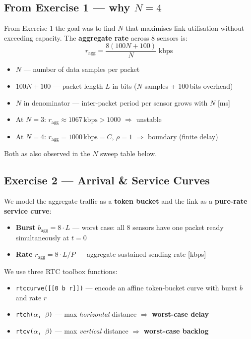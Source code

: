 \documentclass[10pt,a4paper]{article}
\begin{document}
\subsection*{From Exercise 1 --- why $N=4$}
From Exercise 1 the goal was to find $N$ that maximises link utilisation without exceeding capacity. The \textbf{aggregate rate} across 8 sensors is:
\[ r_{\text{agg}} = \frac{8(100N+100)}{N}\;\text{kbps} \]
\begin{itemize}
  \item $N$ --- number of data samples per packet
  \item $100N + 100$ --- packet length $L$ in bits ($N$ samples + 100\,bits overhead)
  \item $N$ in denominator --- inter-packet period per sensor grows with $N$ [ms]
\end{itemize}
\begin{notebox}
\begin{itemize}
  \item At $N=3$: $r_{\text{agg}} \approx 1067\,\text{kbps} > 1000$ $\Rightarrow$ unstable
  \item At $N=4$: $r_{\text{agg}} = 1000\,\text{kbps} = C$, $\rho = 1$ $\Rightarrow$ boundary (finite delay)
\end{itemize}
Both as also observed in the $N$ sweep table below. \\
\end{notebox}
\subsection*{Exercise 2 --- Arrival \& Service Curves}
We model the aggregate traffic as a \textbf{token bucket} and the link as a \textbf{pure-rate service curve}:
\begin{itemize}
  \item \textbf{Burst} $b_{\text{agg}} = 8 \cdot L$ --- worst case: all 8 sensors have one packet ready simultaneously at $t=0$
  \item \textbf{Rate} $r_{\text{agg}} = 8 \cdot L/P$ --- aggregate sustained sending rate [kbps]
\end{itemize}
We use three RTC toolbox functions:
\begin{itemize}
  \item \texttt{rtccurve([[0 b r]])} \quad --- encode an affine token-bucket curve with burst $b$ and rate $r$
  \item \texttt{rtch($\alpha$, $\beta$)} \quad\quad\quad\quad\quad\;\; --- max \emph{horizontal} distance $\Rightarrow$ \textbf{worst-case delay}
  \item \texttt{rtcv($\alpha$, $\beta$)} \quad\quad\quad\quad\quad \;\; --- max \emph{vertical} distance $\Rightarrow$ \textbf{worst-case backlog}
\end{itemize}
\end{document}
